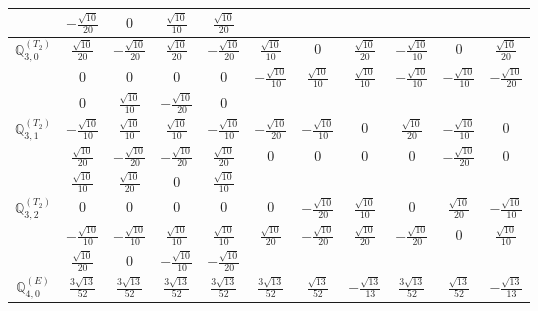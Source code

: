\documentclass[fleqn,10pt,landscape]{article}
\begin{document}
\begin{itemize}
{\begin{center}
\begin{longtable}{ccccccccccc}
& $ - \frac{\sqrt{10}}{20} $ & $ 0 $ & $ \frac{\sqrt{10}}{10} $ & $ \frac{\sqrt{10}}{20} $ & $  $ & $  $ & $  $ & $  $ & $  $ & $  $ \\ \hline
$\mathbb{Q}_{3,0}^{(T_{2})}$ & $ \frac{\sqrt{10}}{20} $ & $ - \frac{\sqrt{10}}{20} $ & $ \frac{\sqrt{10}}{20} $ & $ - \frac{\sqrt{10}}{20} $ & $ \frac{\sqrt{10}}{10} $ & $ 0 $ & $ \frac{\sqrt{10}}{20} $ & $ - \frac{\sqrt{10}}{10} $ & $ 0 $ & $ \frac{\sqrt{10}}{20} $ \\
& $ 0 $ & $ 0 $ & $ 0 $ & $ 0 $ & $ - \frac{\sqrt{10}}{10} $ & $ \frac{\sqrt{10}}{10} $ & $ \frac{\sqrt{10}}{10} $ & $ - \frac{\sqrt{10}}{10} $ & $ - \frac{\sqrt{10}}{10} $ & $ - \frac{\sqrt{10}}{20} $ \\
& $ 0 $ & $ \frac{\sqrt{10}}{10} $ & $ - \frac{\sqrt{10}}{20} $ & $ 0 $ & $  $ & $  $ & $  $ & $  $ & $  $ & $  $ \\ \hline
$\mathbb{Q}_{3,1}^{(T_{2})}$ & $ - \frac{\sqrt{10}}{10} $ & $ \frac{\sqrt{10}}{10} $ & $ \frac{\sqrt{10}}{10} $ & $ - \frac{\sqrt{10}}{10} $ & $ - \frac{\sqrt{10}}{20} $ & $ - \frac{\sqrt{10}}{10} $ & $ 0 $ & $ \frac{\sqrt{10}}{20} $ & $ - \frac{\sqrt{10}}{10} $ & $ 0 $ \\
& $ \frac{\sqrt{10}}{20} $ & $ - \frac{\sqrt{10}}{20} $ & $ - \frac{\sqrt{10}}{20} $ & $ \frac{\sqrt{10}}{20} $ & $ 0 $ & $ 0 $ & $ 0 $ & $ 0 $ & $ - \frac{\sqrt{10}}{20} $ & $ 0 $ \\
& $ \frac{\sqrt{10}}{10} $ & $ \frac{\sqrt{10}}{20} $ & $ 0 $ & $ \frac{\sqrt{10}}{10} $ & $  $ & $  $ & $  $ & $  $ & $  $ & $  $ \\ \hline
$\mathbb{Q}_{3,2}^{(T_{2})}$ & $ 0 $ & $ 0 $ & $ 0 $ & $ 0 $ & $ 0 $ & $ - \frac{\sqrt{10}}{20} $ & $ \frac{\sqrt{10}}{10} $ & $ 0 $ & $ \frac{\sqrt{10}}{20} $ & $ - \frac{\sqrt{10}}{10} $ \\
& $ - \frac{\sqrt{10}}{10} $ & $ - \frac{\sqrt{10}}{10} $ & $ \frac{\sqrt{10}}{10} $ & $ \frac{\sqrt{10}}{10} $ & $ \frac{\sqrt{10}}{20} $ & $ - \frac{\sqrt{10}}{20} $ & $ \frac{\sqrt{10}}{20} $ & $ - \frac{\sqrt{10}}{20} $ & $ 0 $ & $ \frac{\sqrt{10}}{10} $ \\
& $ \frac{\sqrt{10}}{20} $ & $ 0 $ & $ - \frac{\sqrt{10}}{10} $ & $ - \frac{\sqrt{10}}{20} $ & $  $ & $  $ & $  $ & $  $ & $  $ & $  $ \\ \hline
$\mathbb{Q}_{4,0}^{(E)}$ & $ \frac{3 \sqrt{13}}{52} $ & $ \frac{3 \sqrt{13}}{52} $ & $ \frac{3 \sqrt{13}}{52} $ & $ \frac{3 \sqrt{13}}{52} $ & $ \frac{3 \sqrt{13}}{52} $ & $ \frac{\sqrt{13}}{52} $ & $ - \frac{\sqrt{13}}{13} $ & $ \frac{3 \sqrt{13}}{52} $ & $ \frac{\sqrt{13}}{52} $ & $ - \frac{\sqrt{13}}{13} $ \\

\end{longtable}
\end{center}}
\end{itemize}
\end{document}
